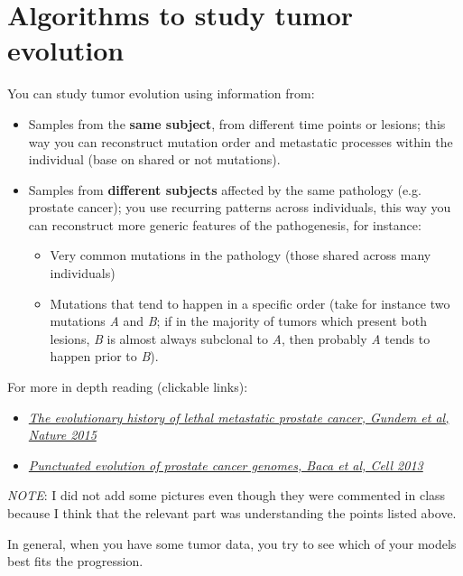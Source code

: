 \section{Algorithms to study tumor evolution}
  
  You can study tumor evolution using information from:
  \begin{itemize}
    \item Samples from the \textbf{same subject}, from different time points or lesions; this way you can reconstruct mutation order and metastatic processes within the individual (base on shared or not mutations). 
    \item Samples from \textbf{different subjects} affected by the same pathology (e.g. prostate cancer); you use recurring patterns across individuals, this way you can reconstruct more generic features of the pathogenesis, for instance:
    \begin{itemize}
      \item Very common mutations in the pathology (those shared across many individuals)
      \item Mutations that tend to happen in a specific order (take for instance two mutations \textit{A} and \textit{B}; if in the majority of tumors which present both lesions, \textit{B} is almost always subclonal to \textit{A}, then probably \textit{A} tends to happen prior to \textit{B}).
    \end{itemize}
  \end{itemize}

  For more in depth reading (clickable links):
  \begin{itemize}
    \item \href{https://pubmed.ncbi.nlm.nih.gov/25830880/}{\textit{The evolutionary history of lethal metastatic prostate cancer, Gundem et al, Nature 2015}}
    \item \href{https://pubmed.ncbi.nlm.nih.gov/23622249/}{\textit{Punctuated evolution of prostate cancer genomes, Baca et al, Cell 2013}}
  \end{itemize}

  \textit{NOTE}: I did not add some pictures even though they were commented in class because I think that the relevant part was understanding the points listed above. 

  In general, when you have some tumor data, you try to see which of your models best fits the progression. 

